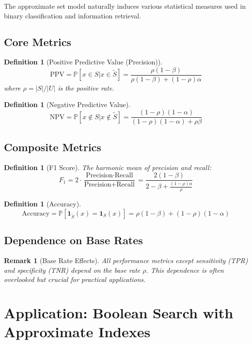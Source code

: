\documentclass[11pt]{article}
\newtheorem{definition}[theorem]{Definition}
\newtheorem{remark}[theorem]{Remark}
\newcommand{\observed}[1]{\tilde{#1}}  %
\newcommand{\prob}[1]{\mathbb{P}\left[#1\right]}
\newcommand{\indicator}[1]{\mathbf{1}_{#1}}
\newcommand{\card}[1]{|#1|}
\newcommand{\fprate}{\alpha}  %
\newcommand{\fnrate}{\beta}   %
\begin{document}
The approximate set model naturally induces various statistical measures used in binary classification and information retrieval.

\subsection{Core Metrics}

\begin{definition}[Positive Predictive Value (Precision)]
$$\text{PPV} = \prob{x \in S | x \in \observed{S}} = \frac{\rho(1-\fnrate)}{\rho(1-\fnrate) + (1-\rho)\fprate}$$
where $\rho = \card{S}/\card{U}$ is the positive rate.
\end{definition}

\begin{definition}[Negative Predictive Value]
$$\text{NPV} = \prob{x \notin S | x \notin \observed{S}} = \frac{(1-\rho)(1-\fprate)}{(1-\rho)(1-\fprate) + \rho\fnrate}$$
\end{definition}

\subsection{Composite Metrics}

\begin{definition}[F1 Score]
The harmonic mean of precision and recall:
$$F_1 = 2 \cdot \frac{\text{Precision} \cdot \text{Recall}}{\text{Precision} + \text{Recall}} = \frac{2(1-\fnrate)}{2-\fnrate + \frac{(1-\rho)\fprate}{\rho}}$$
\end{definition}

\begin{definition}[Accuracy]
$$\text{Accuracy} = \prob{\indicator{\observed{S}}(x) = \indicator{S}(x)} = \rho(1-\fnrate) + (1-\rho)(1-\fprate)$$
\end{definition}

\subsection{Dependence on Base Rates}

\begin{remark}[Base Rate Effects]
All performance metrics except sensitivity (TPR) and specificity (TNR) depend on the base rate $\rho$. This dependence is often overlooked but crucial for practical applications.
\end{remark}

\section{Application: Boolean Search with Approximate Indexes}
\label{sec:boolean-search}
\end{document}
